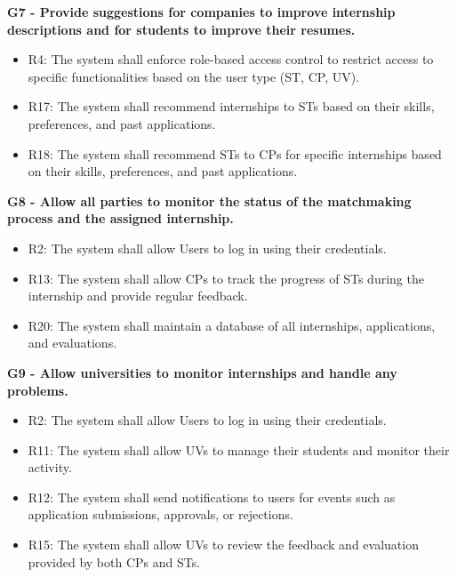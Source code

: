 \vspace{1.5cm}
\textbf{G7 - Provide suggestions for companies to improve internship descriptions and for students to improve their resumes.}
\begin{itemize}
    \item R4: The system shall enforce role-based access control to restrict access to specific functionalities based on the user type (ST, CP, UV).
    \item R17: The system shall recommend internships to STs based on their skills, preferences, and past applications.
    \item R18: The system shall recommend STs to CPs for specific internships based on their skills, preferences, and past applications.
\end{itemize}

\vspace{1.5cm}
\textbf{G8 - Allow all parties to monitor the status of the matchmaking process and the assigned internship.}
\begin{itemize}
    \item R2: The system shall allow Users to log in using their credentials.
    \item R13: The system shall allow CPs to track the progress of STs during the internship and provide regular feedback.
    \item R20: The system shall maintain a database of all internships, applications, and evaluations.
\end{itemize}

\vspace{1.5cm}
\textbf{G9 - Allow universities to monitor internships and handle any problems.}
\begin{itemize}
    \item R2: The system shall allow Users to log in using their credentials.
    \item R11: The system shall allow UVs to manage their students and monitor their activity.
    \item R12: The system shall send notifications to users for events such as application submissions, approvals, or rejections.
    \item R15: The system shall allow UVs to review the feedback and evaluation provided by both CPs and STs.
\end{itemize}

